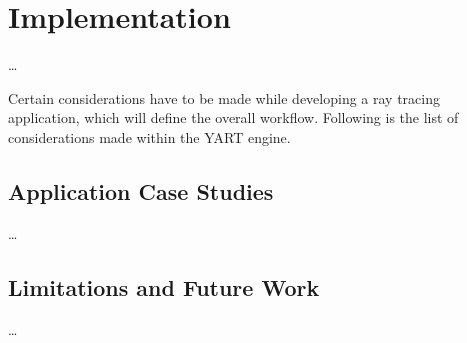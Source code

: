 \chapter{Implementation} \label{ch:Implementation}

\dots

Certain considerations have to be made while developing a ray tracing application, which will define the overall workflow. Following is the list of considerations made within the YART engine. 

\section{Application Case Studies}

\dots

\section{Limitations and Future Work}

\dots
